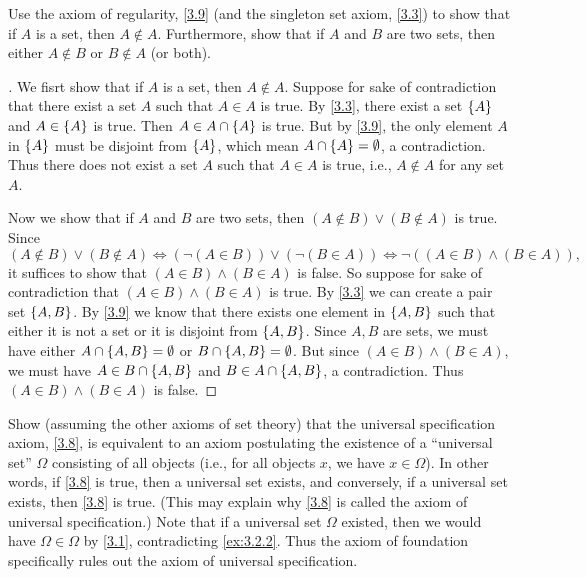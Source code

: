 \begin{ex}\label{ex:3.2.2}
  Use the axiom of regularity, \cref{3.9} (and the singleton set axiom, \cref{3.3}) to show that if \(A\) is a set, then \(A \notin A\).
  Furthermore, show that if \(A\) and \(B\) are two sets, then either \(A \notin B\) or \(B \notin A\) (or both).
\end{ex}

\begin{proof}[]
  We fisrt show that if \(A\) is a set, then \(A \notin A\).
  Suppose for sake of contradiction that there exist a set \(A\) such that \(A \in A\) is true.
  By \cref{3.3}, there exist a set \(\left\lbrace A\right\rbrace\) and \(A \in \left\lbrace A\right\rbrace\) is true.
  Then \(A \in A \cap \left\lbrace A\right\rbrace\) is true.
  But by \cref{3.9}, the only element \(A\) in \(\left\lbrace A\right\rbrace\) must be disjoint from \(\left\lbrace A\right\rbrace\), which mean \(A \cap \left\lbrace A\right\rbrace = \emptyset\), a contradiction.
  Thus there does not exist a set \(A\) such that \(A \in A\) is true, i.e., \(A \notin A\) for any set \(A\).

  Now we show that if \(A\) and \(B\) are two sets, then \((A \notin B) \lor (B \notin A)\) is true.
  Since
  \[
    (A \notin B) \lor (B \notin A) \iff (\lnot(A \in B)) \lor (\lnot(B \in A)) \iff \lnot ((A \in B) \land (B \in A)),
  \]
  it suffices to show that \((A \in B) \land (B \in A)\) is false.
  So suppose for sake of contradiction that \((A \in B) \land (B \in A)\) is true.
  By \cref{3.3} we can create a pair set \(\left\lbrace A, B\right\rbrace\).
  By \cref{3.9} we know that there exists one element in \(\left\lbrace A, B\right\rbrace\) such that either it is not a set or it is disjoint from \(\left\lbrace A, B\right\rbrace\).
  Since \(A, B\) are sets, we must have either \(A \cap \left\lbrace A, B\right\rbrace = \emptyset\) or \(B \cap \left\lbrace A, B\right\rbrace = \emptyset\).
  But since \((A \in B) \land (B \in A)\), we must have \(A \in B \cap \left\lbrace A, B\right\rbrace\) and \(B \in A \cap \left\lbrace A, B\right\rbrace\), a contradiction.
  Thus \((A \in B) \land (B \in A)\) is false.
\end{proof}

\begin{ex}\label{ex:3.2.3}
  Show (assuming the other axioms of set theory) that the universal specification axiom, \cref{3.8}, is equivalent to an axiom postulating the existence of a ``universal set'' \(\Omega\) consisting of all objects (i.e., for all objects \(x\), we have \(x \in \Omega\)).
  In other words, if \cref{3.8} is true, then a universal set exists, and conversely, if a universal set exists, then \cref{3.8} is true.
  (This may explain why \cref{3.8} is called the axiom of universal specification.)
  Note that if a universal set \(\Omega\) existed, then we would have \(\Omega \in \Omega\) by \cref{3.1}, contradicting \cref{ex:3.2.2}.
  Thus the axiom of foundation specifically rules out the axiom of universal specification.
\end{ex}

